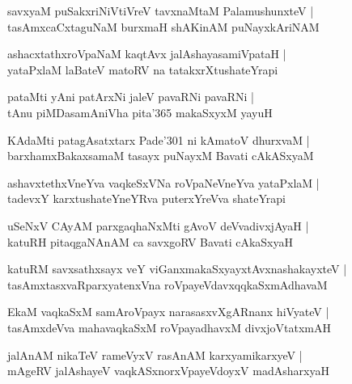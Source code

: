 \documentclass[twoside,12pt,openright]{book}
\newcounter{shloka}[chapter]
\begin{document}
\begin{shloka}%
savxyaM puSakxriNiVtiVreV tavxnaMtaM PalamushunxteV |\\
tasAmxcaCxtaguNaM burxmaH shAKinAM puNayxkAriNAM 
\end{shloka}

\begin{shloka}%
ashacxtathxroVpaNaM kaqtAvx jalAshayasamiVpataH |\\
yataPxlaM laBateV matoRV na tatakxrXtushateYrapi
\end{shloka}

\begin{shloka}%
pataMti yAni patArxNi jaleV pavaRNi pavaRNi |\\
tAnu piMDasamAniVha pita\char'365 makaSxyxM yayuH
\end{shloka}

\begin{shloka}%
KAdaMti patagAsatxtarx Pade\char'301 ni kAmatoV dhurxvaM |\\
barxhamxBakaxsamaM tasayx puNayxM Bavati cAkASxyaM 
\end{shloka}

\begin{shloka}%
ashavxtethxVneYva vaqkeSxVNa roVpaNeVneYva yataPxlaM |\\
tadevxY karxtushateYneYRva puterxYreVva shateYrapi
\end{shloka}

\begin{shloka}%
uSeNxV CAyAM parxgaqhaNxMti gAvoV deVvadivxjAyaH |\\
katuRH pitaqgaNAnAM ca savxgoRV Bavati cAkaSxyaH 
\end{shloka}

\begin{shloka}%
katuRM savxsathxsayx veY viGanxmakaSxyayxtAvxnashakayxteV |\\
tasAmxtasxvaRparxyatenxVna roVpayeVdavxqqkaSxmAdhavaM 
\end{shloka}

\begin{shloka}%
EkaM vaqkaSxM samAroVpayx narasasxvXgARnanx hiVyateV |\\
tasAmxdeVva mahavaqkaSxM roVpayadhavxM divxjoVtatxmAH 
\end{shloka}

\begin{shloka}%
jalAnAM nikaTeV rameVyxV rasAnAM karxyamikarxyeV |\\
mAgeRV jalAshayeV vaqkASxnorxVpayeVdoyxV madAsharxyaH 
\end{shloka}
\end{document}
